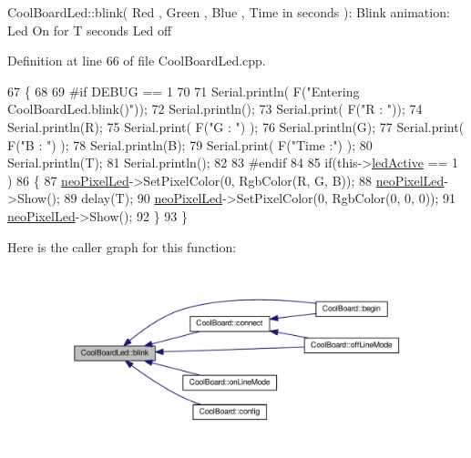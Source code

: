 Cool\+Board\+Led\+::blink( Red , Green , Blue , Time in seconds )\+: Blink animation\+: Led On for T seconds Led off 

Definition at line 66 of file Cool\+Board\+Led.\+cpp.


\begin{DoxyCode}
67 \{
68 
69 \textcolor{preprocessor}{#if DEBUG == 1}
70 
71     Serial.println( F(\textcolor{stringliteral}{"Entering CoolBoardLed.blink()"}));
72     Serial.println();
73     Serial.print( F(\textcolor{stringliteral}{"R : "}));
74     Serial.println(R);
75     Serial.print( F(\textcolor{stringliteral}{"G : "}) );
76     Serial.println(G);
77     Serial.print( F(\textcolor{stringliteral}{"B : "}) );
78     Serial.println(B);
79     Serial.print( F(\textcolor{stringliteral}{"Time :"}) );
80     Serial.println(T);
81     Serial.println();
82 
83 \textcolor{preprocessor}{#endif  }
84 
85     \textcolor{keywordflow}{if}(this->\hyperlink{class_cool_board_led_aadd04d2ecf123247718d77f42fba7f08}{ledActive} == 1 )
86     \{
87         \hyperlink{class_cool_board_led_ac2c13fa462a010cd9242bf297c013923}{neoPixelLed}->SetPixelColor(0, RgbColor(R, G, B));
88         \hyperlink{class_cool_board_led_ac2c13fa462a010cd9242bf297c013923}{neoPixelLed}->Show();
89         delay(T);
90         \hyperlink{class_cool_board_led_ac2c13fa462a010cd9242bf297c013923}{neoPixelLed}->SetPixelColor(0, RgbColor(0, 0, 0));
91         \hyperlink{class_cool_board_led_ac2c13fa462a010cd9242bf297c013923}{neoPixelLed}->Show();
92     \}
93 \}
\end{DoxyCode}
Here is the caller graph for this function\+:\nopagebreak
\begin{figure}[H]
\begin{center}
\leavevmode
\includegraphics[width=350pt]{de/dc0/class_cool_board_led_a96e1ea13003eee34c9dbcef340404426_icgraph}
\end{center}
\end{figure}
\mbox{\label{class_cool_board_led_a1b60e5e30bea96c49ed62ed1bf1ffc8b}} 
